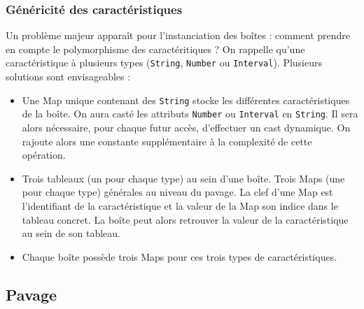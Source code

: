 
\subsubsection{Généricité des caractéristiques}
Un problème majeur apparaît pour l'instanciation des boîtes :  comment prendre en compte le polymorphisme des caractéritiques ? On rappelle qu'une caractéristique à plusieurs types (\verb+String+, \verb+Number+ ou \verb+Interval+). Plusieurs solutions sont envisageables : 
\begin{itemize}
\item
  Une Map unique contenant des \verb+String+ stocke les différentes caractéristiques de la boîte. On aura casté les attributs \verb+Number+ ou \verb+Interval+ en \verb+String+. Il sera alors nécessaire, pour chaque futur accès, d'effectuer un cast dynamique. On rajoute alors une constante supplémentaire à la complexité de cette opération. 
\item 
Trois tableaux (un pour chaque type) au sein d'une boîte. Trois Maps (une pour chaque type) \og générales \fg{} au niveau du pavage. La clef d'une Map est l'identifiant de la caractéristique et la valeur de la Map son indice dans le tableau concret. La boîte peut alors retrouver la valeur de la caractéristique au sein de son tableau.
\item 
  Chaque boîte possède trois Maps pour ces trois types de caractéristiques. 
\end{itemize}


\subsection{Pavage}
